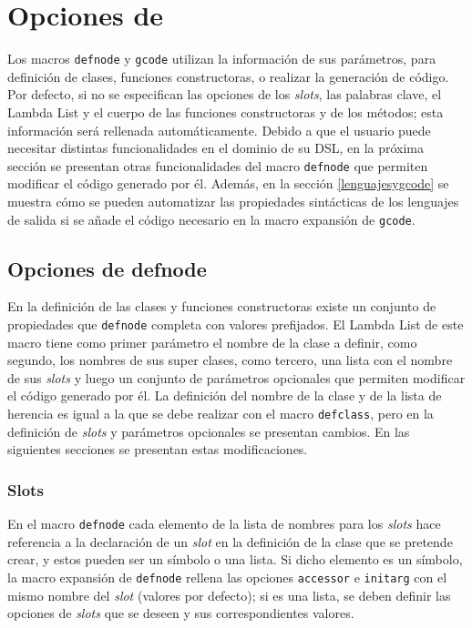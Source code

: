 \chapter{Opciones de \gagm}
\label{chap:GAGMA}

Los macros \texttt{defnode} y \texttt{gcode} utilizan la información de sus parámetros, para definición de clases, funciones constructoras, o realizar la generación de código. Por defecto, si no se especifican las opciones de los \textit{slots}, las palabras clave, el Lambda List y el cuerpo de las funciones constructoras y de los métodos; esta información será rellenada automáticamente. Debido a que el usuario puede necesitar distintas funcionalidades en el dominio de su DSL, en la próxima sección se presentan otras funcionalidades del macro \texttt{defnode} que permiten modificar el código generado por él. Además, en la sección \ref{lenguajesygcode} se muestra cómo se pueden automatizar las propiedades sintácticas de los lenguajes de salida si se añade el código necesario en la macro expansión de \texttt{gcode}. 


\section{Opciones de defnode}
\label{defnodeavanzado}
En la definición de las clases y funciones constructoras existe un conjunto de propiedades que \texttt{defnode} completa con valores prefijados. El Lambda List de este macro tiene como primer parámetro el nombre de la clase a definir, como segundo, los nombres de sus super clases, como tercero, una lista con el nombre de sus \textit{slots} y luego un conjunto de parámetros opcionales que permiten modificar el código generado por él. La definición del nombre de la clase y de la lista de herencia es igual a la que se debe realizar con el macro \texttt{defclass}, pero en la definición de \textit{slots} y parámetros opcionales se presentan cambios. En las siguientes secciones se presentan estas modificaciones.

\subsection{Slots}
En el macro \texttt{defnode} cada elemento de la lista de nombres para los \textit{slots} hace referencia a la declaración de un \textit{slot} en la definición de la clase que se pretende crear, y estos pueden ser un símbolo o una lista. Si dicho elemento es un símbolo, la macro expansión de \texttt{defnode} rellena las opciones \texttt{accessor} e \texttt{initarg} con el mismo nombre del \textit{slot} (valores por defecto); si es una lista, se deben definir las opciones de \textit{slots} que se deseen y sus correspondientes valores.  

